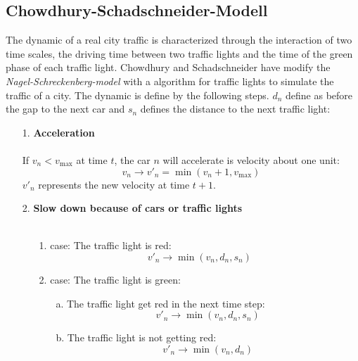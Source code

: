 \documentclass[11pt]{article}
\begin{document}
\subsection{Chowdhury-Schadschneider-Modell}

The dynamic of a real city traffic is characterized through the interaction of two time scales, the driving time between two traffic lights and the time of the green phase of each traffic light. Chowdhury and Schadschneider have modify the \textit{Nagel-Schreckenberg-model} with a algorithm for traffic lights to simulate the traffic of a city. The dynamic is define by the following steps. $d_n$ define as before the gap to the next car and $s_n$ defines the distance to the next traffic light:\\

\begin{itemize}
\item[1.]	\textbf{Acceleration}\\
\\
If $v_n<v_{\mathrm{max}}$ at time $t$, the car $n$ will accelerate is velocity about one unit:
\begin{equation}
v_n \rightarrow v'_n = \min(v_n+1,v_\mathrm{max})
\label{accel_t}
\end{equation}
$v'_n$ represents the new velocity at time $t+1$.
\item[2.]  \textbf{Slow down because of cars or traffic lights}\\
\\
\begin{itemize}
\item[1.]case: The traffic light is red:
\begin{equation}
v'_n \rightarrow \min(v_n,d_n,s_n)
\end{equation}
\item[2.]case: The traffic light is green:
\begin{itemize}
\item[a.] The traffic light get red in the next time step:
\begin{equation}
v'_n \rightarrow \min(v_n,d_n,s_n)
\label{min_lights}
\end{equation}
\item[b.] The traffic light is not getting red:
\begin{equation}
v'_n \rightarrow \min(v_n,d_n)
\end{equation}
\end{itemize}


\end{itemize}
\end{itemize}
\end{document}
